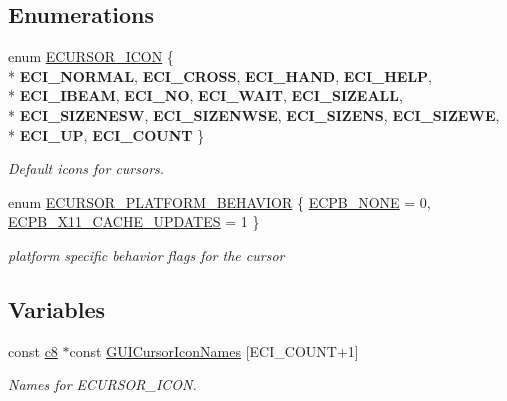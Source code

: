 \subsection*{Enumerations}
\begin{DoxyCompactItemize}
\item 
enum \hyperlink{namespaceirr_1_1gui_aefee802dd632c5735703e40ef40f879b}{E\+C\+U\+R\+S\+O\+R\+\_\+\+I\+C\+ON} \{ \\*
{\bfseries E\+C\+I\+\_\+\+N\+O\+R\+M\+AL}, 
{\bfseries E\+C\+I\+\_\+\+C\+R\+O\+SS}, 
{\bfseries E\+C\+I\+\_\+\+H\+A\+ND}, 
{\bfseries E\+C\+I\+\_\+\+H\+E\+LP}, 
\\*
{\bfseries E\+C\+I\+\_\+\+I\+B\+E\+AM}, 
{\bfseries E\+C\+I\+\_\+\+NO}, 
{\bfseries E\+C\+I\+\_\+\+W\+A\+IT}, 
{\bfseries E\+C\+I\+\_\+\+S\+I\+Z\+E\+A\+LL}, 
\\*
{\bfseries E\+C\+I\+\_\+\+S\+I\+Z\+E\+N\+E\+SW}, 
{\bfseries E\+C\+I\+\_\+\+S\+I\+Z\+E\+N\+W\+SE}, 
{\bfseries E\+C\+I\+\_\+\+S\+I\+Z\+E\+NS}, 
{\bfseries E\+C\+I\+\_\+\+S\+I\+Z\+E\+WE}, 
\\*
{\bfseries E\+C\+I\+\_\+\+UP}, 
{\bfseries E\+C\+I\+\_\+\+C\+O\+U\+NT}
 \}\hypertarget{namespaceirr_1_1gui_aefee802dd632c5735703e40ef40f879b}{}\label{namespaceirr_1_1gui_aefee802dd632c5735703e40ef40f879b}
\begin{DoxyCompactList}\small\item\em Default icons for cursors. \end{DoxyCompactList}
\item 
enum \hyperlink{namespaceirr_1_1gui_abbd186f9cfba2f805d98248df226acef}{E\+C\+U\+R\+S\+O\+R\+\_\+\+P\+L\+A\+T\+F\+O\+R\+M\+\_\+\+B\+E\+H\+A\+V\+I\+OR} \{ \hyperlink{namespaceirr_1_1gui_abbd186f9cfba2f805d98248df226acefaea42899f7236957b21660fd74dda283d}{E\+C\+P\+B\+\_\+\+N\+O\+NE} = 0, 
\hyperlink{namespaceirr_1_1gui_abbd186f9cfba2f805d98248df226acefa462d7a82478e4b89a31c15fdb20bd16e}{E\+C\+P\+B\+\_\+\+X11\+\_\+\+C\+A\+C\+H\+E\+\_\+\+U\+P\+D\+A\+T\+ES} = 1
 \}\begin{DoxyCompactList}\small\item\em platform specific behavior flags for the cursor \end{DoxyCompactList}
\end{DoxyCompactItemize}
\subsection*{Variables}
\begin{DoxyCompactItemize}
\item 
const \hyperlink{namespaceirr_a9395eaea339bcb546b319e9c96bf7410}{c8} $\ast$const \hyperlink{namespaceirr_1_1gui_a33bd57d04dbf92750f64a244df85cd51}{G\+U\+I\+Cursor\+Icon\+Names} \mbox{[}E\+C\+I\+\_\+\+C\+O\+U\+NT+1\mbox{]}
\begin{DoxyCompactList}\small\item\em Names for E\+C\+U\+R\+S\+O\+R\+\_\+\+I\+C\+ON. \end{DoxyCompactList}\end{DoxyCompactItemize}


